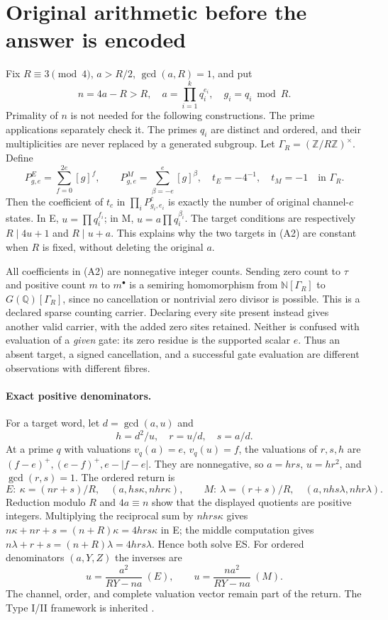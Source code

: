\section{Original arithmetic before the answer is encoded}
Fix $R\equiv3\pmod4$, $a>R/2$, $\gcd(a,R)=1$, and put
\[
 n=4a-R>R,\quad a=\prod_{i=1}^kq_i^{e_i},\quad g_i=q_i\bmod R.
 \tag{A1}
\]
Primality of $n$ is not needed for the following constructions. The prime
applications separately check it. The primes $q_i$ are distinct and ordered,
and their multiplicities are never replaced by a generated subgroup.
Let $\Gamma_R=(\mathbb Z/R\mathbb Z)^\times$. Define
\[
 P^E_{g,e}=\sum_{f=0}^{2e}[g]^f,\qquad
 P^M_{g,e}=\sum_{\beta=-e}^{e}[g]^\beta,
 \quad t_E=-4^{-1},\quad t_M=-1\quad\text{in }\Gamma_R.
 \tag{A2}
\]
Then the coefficient of $t_c$ in $\prod_iP^c_{g_i,e_i}$ is exactly the
number of original channel-$c$ states. In E, $u=\prod q_i^{f_i}$; in M,
$u=a\prod q_i^{\beta_i}$. The target conditions are respectively
$R\mid4u+1$ and $R\mid u+a$. This explains why the two targets in (A2) are
constant when $R$ is fixed, without deleting the original $a$.

All coefficients in (A2) are nonnegative integer counts. Sending zero count
to $\tau$ and positive count $m$ to $m^\bullet$ is a semiring homomorphism
from $\mathbb N[\Gamma_R]$ to $G(\mathbb Q)[\Gamma_R]$, since no cancellation
or nontrivial zero divisor is possible. This is a declared sparse counting
carrier. Declaring every site present instead gives another valid carrier,
with the added zero sites retained. Neither is confused with evaluation of a
\emph{given} gate: its zero residue is the supported scalar $e$. Thus an absent
target, a signed cancellation, and a successful gate evaluation are different
observations with different fibres.

\paragraph{Exact positive denominators.}
For a target word, let $d=\gcd(a,u)$ and
\[
 h=d^2/u,\quad r=u/d,\quad s=a/d.
\]
At a prime $q$ with valuations $v_q(a)=e$, $v_q(u)=f$, the valuations of
$r,s,h$ are $(f-e)^+,(e-f)^+,e-|f-e|$. They are nonnegative, so
$a=hrs$, $u=hr^2$, and $\gcd(r,s)=1$. The ordered return is
\[
 E:\ \kappa=(nr+s)/R,\quad(a,hs\kappa,nhr\kappa),\qquad
 M:\ \lambda=(r+s)/R,\quad(a,nhs\lambda,nhr\lambda).
 \tag{A3}
\]
Reduction modulo $R$ and $4a\equiv n$ show that the displayed quotients are
positive integers. Multiplying the reciprocal sum by $nhrs\kappa$ gives
$n\kappa+nr+s=(n+R)\kappa=4hrs\kappa$ in E; the middle computation gives
$n\lambda+r+s=(n+R)\lambda=4hrs\lambda$. Hence both solve ES.
For ordered denominators $(a,Y,Z)$ the inverses are
\[
 u=\frac{a^2}{RY-na}\ (E),\qquad
 u=\frac{na^2}{RY-na}\ (M).
 \tag{A4}
\]
The channel, order, and complete valuation vector remain part of the return.
The Type I/II framework is inherited \cite[\S2, Propositions 2.2 and 2.6]{ET}.

